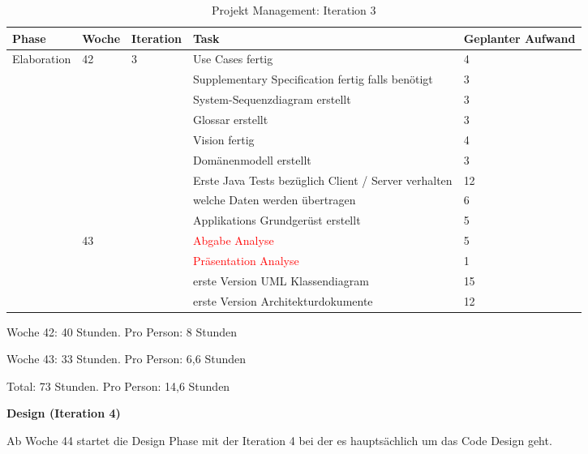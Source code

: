 \begin{table}[htp]
\begin{tabular}{ | l | l | l |  p{6.5cm} | l |}
\hline
Phase & Woche & Iteration & Task & Geplanter Aufwand \\ \hline \hline
Elaboration & 42 &  3  & Use Cases fertig & 4 \\ \hline
 &  &  & Supplementary Specification fertig falls benötigt & 3 \\ \hline
 &  &  & System-Sequenzdiagram erstellt & 3 \\ \hline
 &  &  & Glossar erstellt & 3 \\ \hline
 &  &  & Vision fertig & 4 \\ \hline
 &  &  & Domänenmodell erstellt & 3 \\ \hline
 &  &  & Erste Java Tests bezüglich Client / Server verhalten & 12 \\ \hline
 &  &  & welche Daten werden übertragen & 6 \\ \hline
 &  &  & Applikations Grundgerüst erstellt & 5 \\ \hline
 \hline
 & 43 &  & \textcolor{red}{Abgabe Analyse} & 5 \\ \hline
 &  &  & \textcolor{red}{Präsentation Analyse} & 1 \\ \hline
 &  &  & erste Version UML Klassendiagram & 15  \\ \hline
 &  &  & erste Version Architekturdokumente & 12  \\ \hline
\end{tabular}
\caption{Projekt Management: Iteration 3}
\end{table}
Woche 42: 40 Stunden. Pro Person: 8 Stunden

Woche 43: 33 Stunden. Pro Person: 6,6 Stunden

Total: 73 Stunden. Pro Person: 14,6 Stunden

\textbf{Design (Iteration 4)}

Ab Woche 44 startet die Design Phase mit der Iteration 4 bei der es hauptsächlich um das Code Design geht.


